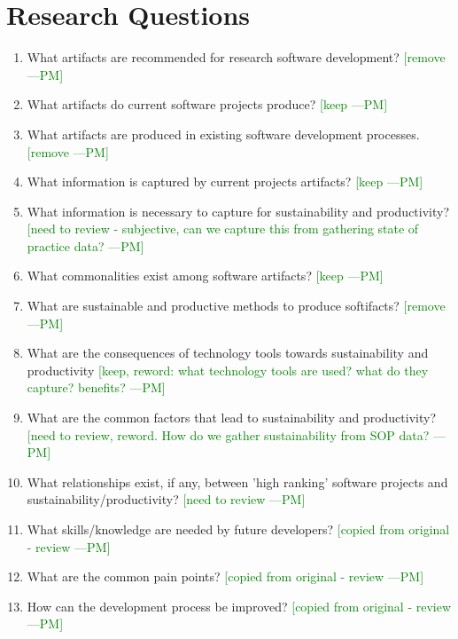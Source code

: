 \documentclass[letterpaper,cleveref]{lipics-v2019}
\newcommand{\authornote}[3]{\textcolor{#1}{[#3 ---#2]}}
\newcommand{\authornote}[3]{}
\newcommand{\pmi}[1]{\authornote{green}{PM}{#1}} %
\theoremstyle{definition}
\begin{document}
\section{Research Questions}\label{ResearchQuestions}
	\begin{enumerate} 
		\item What artifacts are recommended for research software development?
\pmi{remove}
		\item What artifacts do current software projects produce?
\pmi{keep}
		\item What artifacts are produced in existing software development processes. 
\pmi{remove}
		\item What information is captured by current projects artifacts?
\pmi{keep}
		\item What information is necessary to capture for sustainability and productivity?
\pmi{need to review - subjective, can we capture this from gathering state of practice data?}
		\item What commonalities exist among software artifacts?
\pmi{keep}
		\item What are sustainable and productive methods to produce softifacts?
\pmi{remove}
		\item What are the consequences of technology tools towards sustainability and productivity  \pmi{keep, reword: what technology tools are used? what do they capture? benefits?}
		\item What are the common factors that lead to sustainability and productivity?
\pmi{need to review, reword. How do we gather sustainability from SOP data?}
		\item What relationships exist, if any, between 'high ranking' software projects and sustainability/productivity?
 \pmi{need to review}	
		\item What skills/knowledge are needed by future developers?	\pmi{copied from original - review}
		\item What are the common pain points?	\pmi{copied from original - review}
		\item How can the development process be improved?	\pmi{copied from original - review}
	\end{enumerate} 
\end{document}
